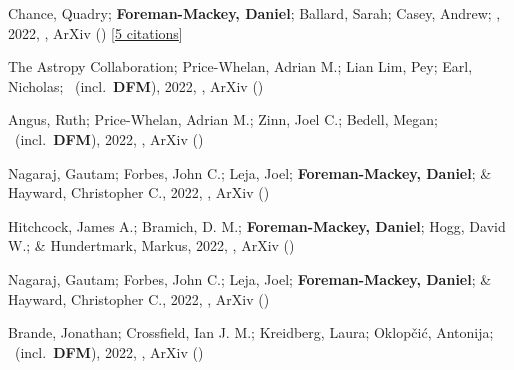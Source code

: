 \item[{\color{numcolor}\scriptsize82}] Chance, Quadry; \textbf{Foreman-Mackey, Daniel}; Ballard, Sarah; Casey, Andrew; \etal, 2022, , ArXiv () [\href{https://ui.adsabs.harvard.edu/abs/2022arXiv220611275C}{5 citations}]

\item[{\color{numcolor}\scriptsize81}] The Astropy Collaboration; Price-Whelan, Adrian M.; Lian Lim, Pey; Earl, Nicholas; \etal\ (incl.\ \textbf{DFM}), 2022, , ArXiv ()

\item[{\color{numcolor}\scriptsize80}] Angus, Ruth; Price-Whelan, Adrian M.; Zinn, Joel C.; Bedell, Megan; \etal\ (incl.\ \textbf{DFM}), 2022, , ArXiv ()

\item[{\color{numcolor}\scriptsize79}] Nagaraj, Gautam; Forbes, John C.; Leja, Joel; \textbf{Foreman-Mackey, Daniel}; \& Hayward, Christopher C., 2022, , ArXiv ()

\item[{\color{numcolor}\scriptsize78}] Hitchcock, James A.; Bramich, D. M.; \textbf{Foreman-Mackey, Daniel}; Hogg, David W.; \& Hundertmark, Markus, 2022, , ArXiv ()

\item[{\color{numcolor}\scriptsize77}] Nagaraj, Gautam; Forbes, John C.; Leja, Joel; \textbf{Foreman-Mackey, Daniel}; \& Hayward, Christopher C., 2022, , ArXiv ()

\item[{\color{numcolor}\scriptsize76}] Brande, Jonathan; Crossfield, Ian J. M.; Kreidberg, Laura; Oklop{\v{c}}i{\'c}, Antonija; \etal\ (incl.\ \textbf{DFM}), 2022, , ArXiv ()

